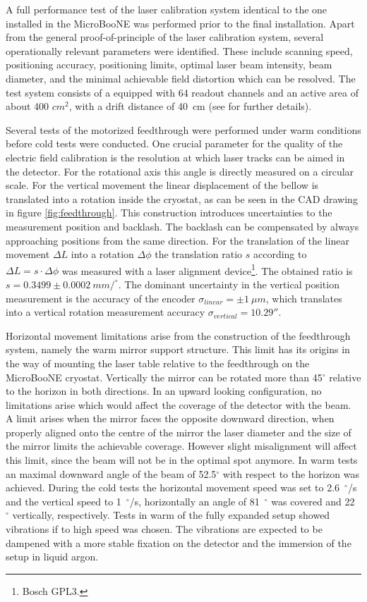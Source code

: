 A full performance test of the laser calibration system identical to the one installed in the MicroBooNE \lartpc was performed prior to the final installation. Apart from the general proof-of-principle of the laser calibration system, several operationally relevant parameters were identified. These include scanning speed, positioning accuracy, positioning limits, optimal laser beam intensity, beam diameter, and the minimal achievable field distortion which can be resolved. The test system consists of a \lartpc equipped with 64 readout channels and an active area of about 400 $cm^2$, with a drift distance of 40~cm (see \cite{lasertest} for further details).

Several tests of the motorized feedthrough were performed under warm conditions before cold tests were conducted. One crucial parameter for the quality of the electric field calibration is the resolution at which laser tracks can be aimed in the detector. For the rotational axis this angle is directly measured on a circular scale. For the vertical movement the linear displacement of the bellow is translated into a rotation inside the cryostat, as can be seen in the CAD drawing in figure \ref{fig:feedthrough}. This construction introduces uncertainties to the measurement position and backlash. The backlash can be compensated by always approaching positions from the same direction. For the translation of the linear movement $\Delta L$ into a rotation $\Delta \phi$ the translation ratio $s$ according to $\Delta L = s \cdot \Delta \phi$ was measured with a laser alignment device\footnote{Bosch GPL3.}.  The obtained ratio is $s=0.3499\pm 0.0002~mm/^{\circ}$. The dominant uncertainty in the vertical position measurement is the accuracy of the encoder $\sigma_{linear} = \pm 1~\mu m$, which translates into a vertical rotation measurement accuracy $\sigma_{vertical} = 10.29{''}$. 

Horizontal movement limitations arise from the construction of the feedthrough system, namely the warm mirror support structure. This limit has its origins in the way of mounting the laser table relative to the feedthrough on the MicroBooNE cryostat. Vertically the mirror can be rotated more than 45$^{\circ}$ relative to the horizon in both directions. In an upward looking configuration, no limitations arise which would affect the coverage of the detector with the beam. A limit arises when the mirror faces the opposite downward direction, when properly aligned onto the centre of the mirror the laser diameter and the size of the mirror limits the achievable coverage. However slight misalignment will affect this limit, since the beam will not be in the optimal spot anymore. In warm tests an maximal downward angle of the beam of 52.5$^{\circ}$ with respect to the horizon was achieved. During the cold tests the horizontal movement speed was set to 2.6~{$^{\circ}$/s} and the vertical speed to 1~{$^{\circ}$/s}, horizontally an angle of 81~{$^{\circ}$} was covered and 22~{$^{\circ}$} vertically, respectively. Tests in warm of the fully expanded setup showed vibrations if to high speed was chosen. The vibrations are expected to be dampened with a more stable fixation on the detector and the immersion of the setup in liquid argon.

